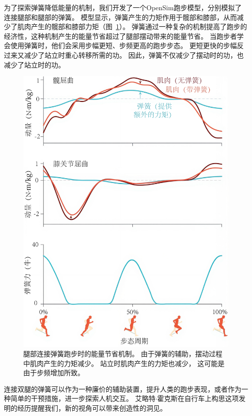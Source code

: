 为了探索弹簧降低能量的机制，我们开发了一个OpenSim跑步模型，分别模拟了连接腿部和腿部的弹簧。
模型显示，弹簧产生的力矩作用于髋部和膝部，从而减少了肌肉产生的髋部和膝部力矩（图~\ref{fig:12_16}）。
弹簧通过一种复杂的机制提高了跑步的经济性，这种机制产生的能量节省超过了腿部摆动带来的能量节省。
当跑步者学会使用弹簧时，他们会采用步幅更短、步频更高的跑步步态。
更短更快的步幅反过来又减少了站立时重心转移所需的功。
因此，弹簧不仅减少了摆动时的功，也减少了站立时的功。


\begin{figure}[!htb]
	\centering
	\includegraphics[width=1.0\linewidth]{chap12/12_16}
	\caption{腿部连接弹簧跑步时的能量节省机制。
		由于弹簧的辅助，摆动过程中肌肉产生的力矩减少。
		站立时肌肉产生的力矩也减少，
		这可能是由于步频增加所致\cite{simpson2019connecting}。 \label{fig:12_16}}
\end{figure}


连接双腿的弹簧可以作为一种廉价的辅助装置，提升人类的跑步表现，或者作为一种简单的干预措施，进一步探索人机交互。
艾略特$\cdot$霍克斯在自行车上构思这项发明的经历提醒我们，新的视角可以带来创造性的洞见。
